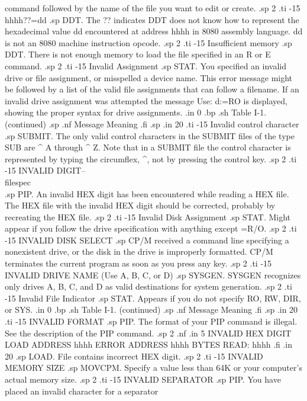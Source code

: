 command followed by the name of the file you want to edit or 
create.
.sp 2
.ti -15
hhhh??=dd
.sp
DDT.  The ?? indicates DDT does not know how to represent the 
hexadecimal value dd encountered at address hhhh in 8080 assembly 
language.  dd is not an 8080 machine instruction opcode.
.sp 2
.ti -15
Insufficient memory
.sp
DDT.  There is not enough memory to load the file specified in an 
R or E command.
.sp 2
.ti -15
Invalid Assignment
.sp
STAT.  You specified an invalid drive or file assignment, or 
misspelled a device name.  This error message might be followed 
by a list of the valid file assignments that can follow a 
filename.  If an invalid drive assignment was attempted the 
message Use: d:=RO is displayed, showing the proper syntax for 
drive assignments.
.in 0
.bp
.sh
                     Table I-1.  (continued)
.sp
.nf
     Message        Meaning
.fi
.sp
.in 20
.ti -15
Invalid control character
.sp
SUBMIT.  The only valid control characters in the SUBMIT files of 
the type SUB are ^ A through ^ Z.  Note that in a SUBMIT file the 
control character is represented by typing the circumflex, ^, not 
by pressing the control key.
.sp 2
.ti -15
INVALID DIGIT--\\{filespec\\}
.sp
PIP.  An invalid HEX digit has been encountered while reading a 
HEX file.  The HEX file with the invalid HEX digit should be 
corrected, probably by recreating the HEX file.
.sp 2
.ti -15
Invalid Disk Assignment
.sp
STAT.  Might appear if you follow the drive specification with 
anything except =R/O.
.sp 2
.ti -15
INVALID DISK SELECT
.sp
CP/M received a command line specifying a nonexistent drive, or 
the disk in the drive is improperly formatted.  CP/M terminates 
the current program as soon as you press any key.
.sp 2
.ti -15
INVALID DRIVE NAME (Use A, B, C, or D)
.sp
SYSGEN.  SYSGEN recognizes only drives A, B, C, and D as valid 
destinations for system generation.
.sp 2
.ti -15
Invalid File Indicator
.sp
STAT.  Appears if you do not specify RO, RW, DIR, or SYS.
.in 0
.bp
.sh
                     Table I-1.  (continued)
.sp
.nf
     Message        Meaning
.fi
.sp
.in 20
.ti -15
INVALID FORMAT
.sp
PIP.  The format of your PIP command is illegal.  See the 
description of the PIP command.
.sp 2
.nf
.in 5
INVALID HEX DIGIT
LOAD ADDRESS hhhh
ERROR ADDRESS hhhh
BYTES READ:
hhhh
.fi
.in 20
.sp
LOAD.  File contains incorrect HEX digit.
.sp 2
.ti -15
INVALID MEMORY SIZE
.sp
MOVCPM.  Specify a value less than 64K or your computer's actual 
memory size.
.sp 2
.ti -15
INVALID SEPARATOR
.sp
PIP.  You have placed an invalid character for a separator 
